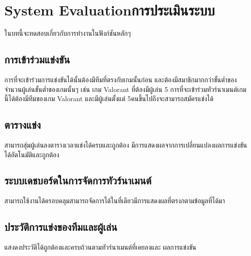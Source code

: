 \chapter{\ifenglish System Evaluation\else การประเมินระบบ\fi}

ในบทนี้จะทดสอบเกี่ยวกับการทำงานในฟังก์ชันหลักๆ

\section{การเข้าร่วมแข่งขัน}
การที่จะเข้าร่วมการแข่งขันได้นั้นต้องมีทีมที่ตรงกับเกมนั้นก่อน และต้องมีสมาชิกมากกว่าขั้นต่ำของจำนวนผู้เล่นขั้นต่ำของเกมนั้นๆ เช่น
เกม Valorant ที่ต้องมีผู้เล่น 5 การที่จะเข้าร่วมทัวร์นาเมนต์เกมนี้ได้ต้องมีทีมของเกม Valorant และมีผู้เล่นตั้งแต่ 5คนขึ้นไปถึงจะสามารถสมัครแข่งได้
\section{ตารางแข่ง}
สามารถสุ่มผู้เล่นลงตารางเวลาแข่งได้ครบและถูกต้อง มีการแสดงผลจากการเปลี่ยนแปลงผลการแข่งขันได้อัตโนมัติและถูกต้อง
\section{ระบบเดชบอร์ดในการจัดการทัวร์นาเมนต์}
สามารถใช้งานได้ครอบคลุมสามารถจัดการได้ในที่เดียวมีการแสดงผลที่ตรงกตามข้อมูลที่ได้มา
\section{ประวัติการแข่งของทีมและผู้เล่น}
แสงดงประวัติได้ถูกต้องและครบถ้วนตามทัวร์นาเมนต์ที่เคยลงและ ผลการแข่งขัน
